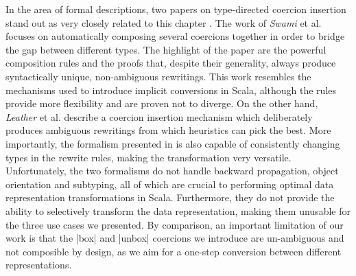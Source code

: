 In the area of formal descriptions, two papers on type-directed coercion insertion stand out as very closely related to this chapter \cite{swamy-typed-coercions, leather-type-changing-rewriting}. The work of {\em Swami} et al. \cite{swamy-typed-coercions} focuses on automatically composing several coercions together in order to bridge the gap between different types. The highlight of the paper are the powerful composition rules and the proofs that, despite their generality, always produce syntactically unique, non-ambiguous rewritings. This work resembles the mechanisms used to introduce implicit conversions in Scala, although the rules provide more flexibility and are proven not to diverge. On the other hand, {\em Leather} et al. \cite{leather-type-changing-rewriting} describe a coercion insertion mechanism which deliberately produces ambiguous rewritings from which heuristics can pick the best. More importantly, the formalism presented in \cite{leather-type-changing-rewriting} is also capable of consistently changing types in the rewrite rules, making the transformation very versatile. Unfortunately, the two formalisms do not handle backward propagation, object orientation and subtyping, all of which are crucial to performing optimal data representation transformations in Scala. Furthermore, they do not provide the ability to selectively transform the data representation, making them unusable for the three use cases we presented. By comparison, an important limitation of our work is that the |box| and |unbox| coercions we introduce are un-ambiguous and not composible by design, as we aim for a one-step conversion between different representations.

%
%
%

